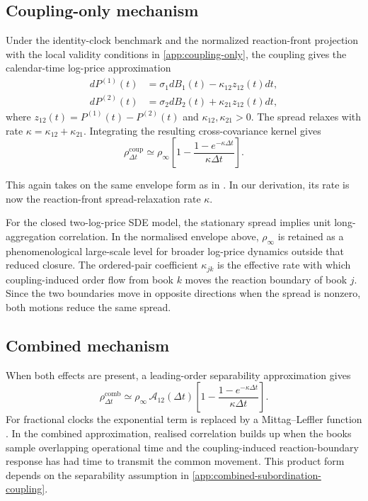 \documentclass[5p,final]{elsarticle}
\begin{document}
\subsection{Coupling-only mechanism}

Under the identity-clock benchmark and the normalized reaction-front projection with the local validity conditions in \ref{app:coupling-only}, the coupling gives the calendar-time log-price approximation
\begin{align}
 dP^{(1)}(t)&=\sigma_1 dB_1(t)-\kappa_{12}z_{12}(t)dt, \\
 dP^{(2)}(t)&=\sigma_2 dB_2(t)+\kappa_{21}z_{12}(t)dt,
 \label{eq:coupling-only}
\end{align}
where $z_{12}(t)=P^{(1)}(t)-P^{(2)}(t)$ and $\kappa_{12},\kappa_{21}>0$. The spread relaxes with rate $\kappa=\kappa_{12}+\kappa_{21}$.
Integrating the resulting cross-covariance kernel gives
\begin{equation}
 \rho_{\Delta t}^{\mathrm{coup}}
 \simeq
 \rho_\infty \left[1-\frac{1-e^{-\kappa\Delta t}}{\kappa\Delta t}\right].
\end{equation}

This again takes on the same envelope form as in \citet{toth2009}. In our derivation, its rate is now the reaction-front spread-relaxation rate $\kappa$.

For the closed two-log-price SDE model, the stationary spread implies unit long-aggregation correlation. In the normalised envelope above, \(\rho_\infty\) is retained as a phenomenological large-scale level for broader log-price dynamics outside that reduced closure. The ordered-pair coefficient \(\kappa_{jk}\) is the effective rate with which coupling-induced order flow from book \(k\) moves the reaction boundary of book \(j\). Since the two boundaries move in opposite directions when the spread is nonzero, both motions reduce the same spread.

\subsection{Combined mechanism}

When both effects are present, a leading-order separability approximation gives
\begin{equation}
 \rho_{\Delta t}^{\mathrm{comb}}
 \simeq
 \rho_\infty \, \mathcal{A}_{12}(\Delta t)
 \left[1-\frac{1-e^{-\kappa\Delta t}}{\kappa\Delta t}\right].
\end{equation}
For fractional clocks the exponential term is replaced by a Mittag--Leffler function \cite{Haubold2011MittagLeffler}. 
In the combined approximation, realised correlation builds up when the books sample overlapping operational time and the coupling-induced reaction-boundary response has had time to transmit the common movement. This product form depends on the separability assumption in \ref{app:combined-subordination-coupling}.
\end{document}

